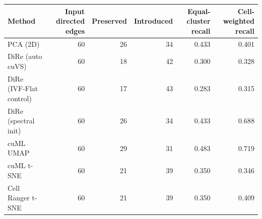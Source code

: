 \begin{tabular}{@{}lrrrrr@{}}
\toprule
Method & Input directed edges & Preserved & Introduced & Equal-cluster recall & Cell-weighted recall \\
\midrule
PCA (2D) & 60 & 26 & 34 & 0.433 & 0.401 \\
DiRe (auto cuVS) & 60 & 18 & 42 & 0.300 & 0.328 \\
DiRe (IVF-Flat control) & 60 & 17 & 43 & 0.283 & 0.315 \\
DiRe (spectral init) & 60 & 26 & 34 & 0.433 & 0.688 \\
cuML UMAP & 60 & 29 & 31 & 0.483 & 0.719 \\
cuML t-SNE & 60 & 21 & 39 & 0.350 & 0.346 \\
Cell Ranger t-SNE & 60 & 21 & 39 & 0.350 & 0.409 \\
\bottomrule
\end{tabular}
